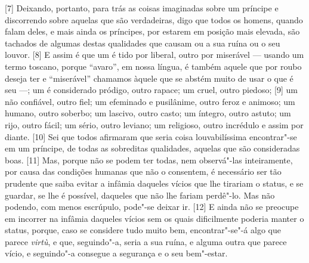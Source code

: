 {[}7{]} Deixando, portanto, para trás as coisas imaginadas sobre um
príncipe e discorrendo sobre aquelas que são verdadeiras, digo que todos
os homens, quando falam deles, e mais ainda os príncipes, por estarem em
posição mais elevada, são tachados de algumas destas qualidades que
causam ou a sua ruína ou o seu louvor. {[}8{]} E assim é que um é tido
por liberal, outro por miserável --- usando um termo toscano, porque
``avaro'', em nossa língua, é também aquele que por roubo deseja ter e
``miserável'' chamamos àquele que se abstém muito de usar o que é seu
---; um é considerado pródigo, outro rapace; um cruel, outro piedoso;
{[}9{]} um não confiável, outro fiel; um efeminado e pusilânime, outro
feroz e animoso; um humano, outro soberbo; um lascivo, outro casto; um
íntegro, outro astuto; um rijo, outro fácil; um sério, outro leviano; um
religioso, outro incrédulo e assim por diante. {[}10{]} Sei que todos
afirmaram que seria coisa louvabilíssima encontrar"-se em um príncipe,
de todas as sobreditas qualidades, aquelas que são consideradas boas.
{[}11{]} Mas, porque não se podem ter todas, nem observá"-las
inteiramente, por causa das condições humanas que não o consentem, é
necessário ser tão prudente que saiba evitar a infâmia daqueles vícios que lhe tirariam o status, e se guardar, se lhe
é possível, daqueles que não lhe fariam perdê"-lo. Mas não podendo, com
menos escrúpulo, pode"-se deixar ir. {[}12{]} E ainda não se preocupe em
incorrer na infâmia daqueles vícios sem os quais dificilmente poderia
manter o status, porque, caso se considere tudo muito bem,
encontrar"-se"-á algo que parece \emph{virtù}, e que, seguindo"-a, seria a
sua ruína, e alguma outra que parece vício, e seguindo"-a consegue a
segurança e o seu bem"-estar.

